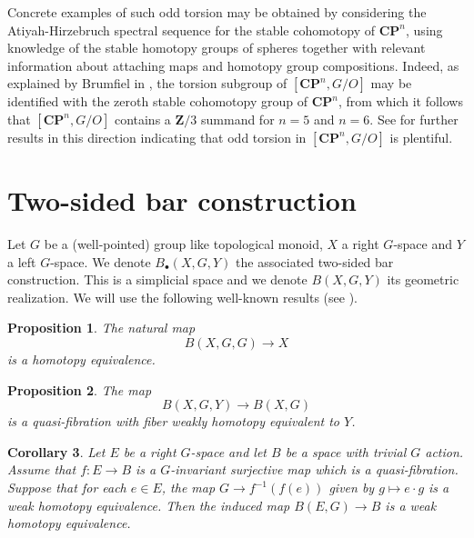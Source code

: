 \documentclass[reqno]{amsart}
\theoremstyle{theorem}
\newtheorem{corollary}{Corollary}[section]
\newtheorem{proposition}[corollary]{Proposition}
\theoremstyle{remark}
\theoremstyle{definition}
\newcommand{\bC}{\mathbf{C}}
\newcommand{\bZ}{\mathbf{Z}}
\begin{document}
Concrete examples of such odd torsion may be obtained by considering the Atiyah-Hirzebruch spectral sequence for the stable cohomotopy of $\bC \mathbf{P}^n$, using knowledge of the stable homotopy groups of spheres together with relevant information about attaching maps and homotopy group compositions. Indeed, as explained by Brumfiel  in  \cite{B68},  the torsion subgroup of $[\bC \mathbf{P}^n , G/O]$ may be identified with the zeroth stable cohomotopy group of $\bC \mathbf{P}^n$, from which it follows that  $[\bC \mathbf{P}^n, G/O]$ contains a $\bZ/3$ summand for $n=5$ and $n=6$.  See \cite{B68} for further results in this direction indicating that odd torsion in $[\bC \mathbf{P}^n, G/O]$ is plentiful.










\appendix
\section{Two-sided bar construction}


Let $G$ be a (well-pointed) group like topological monoid, $X$ a right $G$-space and $Y$ a left $G$-space.
We denote $B_\bullet(X,G,Y)$ the associated two-sided bar construction. This is a simplicial space and we denote $B(X,G,Y)$
its geometric realization. We will use the following well-known results (see \cite{May}).


 
\begin{proposition}\label{lem:bar0}
The natural map \[B(X,G,G)\to X\] is a homotopy equivalence.
\end{proposition}


\begin{proposition}\label{lem:bar1}
The map 
\[B(X,G,Y)\to B(X,G)\]
is a quasi-fibration with fiber weakly homotopy equivalent to $Y$.
\end{proposition}


\begin{corollary}\label{lem:bar2}
Let $E$ be a right $G$-space and let $B$ be a space with trivial $G$ action. Assume that $f:E \to B$ is a $G$-invariant surjective map which is a quasi-fibration. Suppose that for each $e\in E$, the map $G\to f^{-1}(f(e))$ given by $g\mapsto e\cdot g$ is a weak homotopy equivalence. Then the induced map $B(E,G)\to B$ is a weak homotopy equivalence.
\end{corollary}
\end{document}
